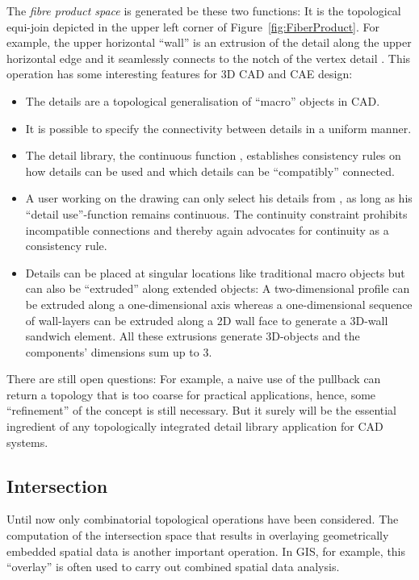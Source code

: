 \documentclass[5p]{elsarticle}
\newcommand{\qq}[1]{``#1''}
\begin{document}
The \emph{fibre product space}  is generated be these two functions: 
It is the topological equi-join  depicted in the upper 
left corner of Figure~\ref{fig:FiberProduct}. For example, the upper horizontal \qq{wall} is 
an extrusion of the detail  along the upper horizontal edge and it seamlessly connects 
to the notch of the vertex detail . 
This operation has some interesting features for 3D CAD and CAE design: 
\begin{itemize}
\item The details are a topological generalisation of \qq{macro} objects in CAD. 
\item It is possible to specify the connectivity between details in a uniform manner. 
\item The detail library, the continuous function , establishes consistency rules on how 
      details can be used and which details can be \qq{compatibly} connected. 
\item A user working on the drawing  can only select his details from , as long as his 
      \qq{detail use}-function  remains continuous. The continuity constraint prohibits 
      incompatible connections and thereby again advocates for continuity as a consistency rule. 
\item Details can be placed at singular locations like traditional macro objects but can also be 
      \qq{extruded} along extended objects: 
      A two-dimensional profile can be extruded along a one-dimensional axis whereas a 
      one-dimensional sequence of wall-layers can be extruded along a 2D wall 
      face to generate a 3D-wall sandwich element. All these extrusions generate 3D-objects 
      and the components' dimensions sum up to 3. 
\end{itemize}

There are still open questions: For example, a naive use of the pullback can return a topology 
that is too coarse for practical applications, hence, some \qq{refinement} of the concept is still 
necessary. But it surely will be the essential ingredient of any topologically integrated detail 
library application for CAD systems. 


\subsection{Intersection} 

Until now only combinatorial topological operations have been considered. 
The computation of the intersection space that results in overlaying 
geometrically embedded spatial data is another important operation. 
In GIS, for example, this \qq{overlay} is often used to carry out combined spatial 
data analysis. 
\end{document}
